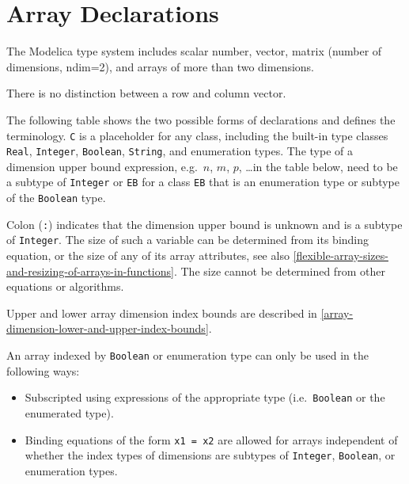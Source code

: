 \section{Array Declarations}\label{array-declarations}

The Modelica type system includes scalar number, vector, matrix (number of dimensions, ndim=2), and arrays of more than two dimensions.

\begin{nonnormative}
There is no distinction between a row and column vector.
\end{nonnormative}

The following table shows the two possible forms of declarations and defines the terminology.
\lstinline!C! is a placeholder for any class, including the built-in type classes \lstinline!Real!, \lstinline!Integer!, \lstinline!Boolean!, \lstinline!String!, and enumeration types.
The type of a dimension upper bound expression, e.g.\ $n$, $m$, $p$, \ldots in the table below, need to be a subtype of \lstinline!Integer! or \lstinline!EB! for a class \lstinline!EB! that is an enumeration type or subtype of the \lstinline!Boolean! type.

Colon (\lstinline!:!) indicates that the dimension upper bound is unknown and is a subtype of \lstinline!Integer!.
The size of such a variable can be determined from its binding equation, or the size of any of its array attributes, see also \cref{flexible-array-sizes-and-resizing-of-arrays-in-functions}.
The size cannot be determined from other equations or algorithms.

Upper and lower array dimension index bounds are described in \cref{array-dimension-lower-and-upper-index-bounds}.

An array indexed by \lstinline!Boolean! or enumeration type can only be used in the following ways:
\begin{itemize}
\item
  Subscripted using expressions of the appropriate type (i.e.\ \lstinline!Boolean! or the enumerated type).
\item
  Binding equations of the form \lstinline!x1 = x2! are allowed for arrays independent of whether the index types of dimensions are subtypes of \lstinline!Integer!, \lstinline!Boolean!, or enumeration types.
\end{itemize}

